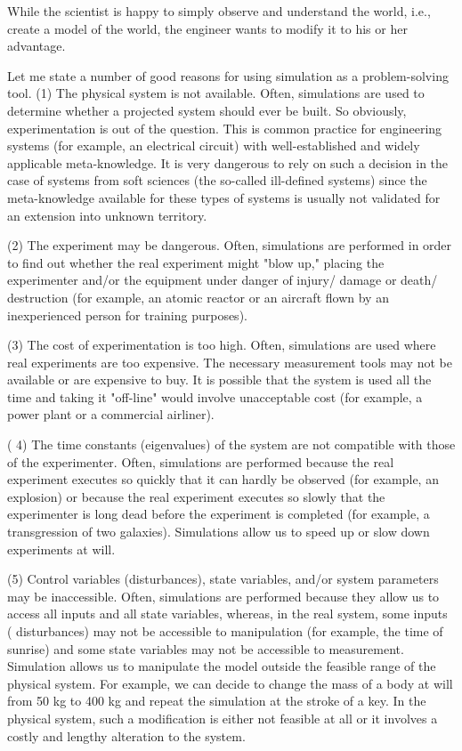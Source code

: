 

While the scientist is happy to simply observe and understand the world, i.e., create a model of the world, the engineer wants to modify it to his or her advantage.

Let me state a number of good reasons for using simulation as a problem-solving tool.
(1) The physical system is not available. Often, simulations are used to determine whether a projected system should ever be built. So obviously, experimentation is out of the question. This is common practice for engineering systems (for example, an electrical circuit) with well-established and widely applicable meta-knowledge. It is very dangerous to rely on such a decision in the case of systems from soft sciences (the so-called ill-defined systems) since the meta-knowledge available for these types of systems is usually not validated for an extension into unknown territory.

(2) The experiment may be dangerous. Often, simulations are performed in order to find out whether the real experiment might "blow up," placing the experimenter and/or the equipment under danger of injury/ damage or death/ destruction (for example, an atomic reactor or an aircraft flown by an inexperienced person for training purposes).

(3) The cost of experimentation is too high. Often, simulations are used where real experiments are too expensive. The necessary measurement tools may not be available or are expensive to buy.
It is possible that the system is used all the time and taking it "off-line" would involve unacceptable cost (for example, a power plant or a commercial airliner).

( 4) The time constants (eigenvalues) of the system are not compatible with those of the experimenter. Often, simulations are performed because the real experiment executes so quickly that it can hardly be observed (for example, an explosion) or because the real experiment executes so slowly that the experimenter is long dead before the experiment is completed (for example, a transgression of two galaxies). Simulations allow us to speed up or slow down experiments at will.

(5) Control variables (disturbances), state variables, and/or system parameters may be inaccessible. Often, simulations are performed because they allow us to access all inputs and all state variables, whereas, in the real system, some inputs ( disturbances) may not be accessible to manipulation (for example, the time of sunrise) and some state variables may not be accessible to measurement. Simulation allows us to manipulate the model outside the feasible range of the physical system. For example, we can decide to change the mass of a body at will from 50  kg to 400 kg and repeat the simulation at the stroke of a key. In the physical system, such a modification is either not feasible at all or it involves a costly and lengthy alteration to the system.

